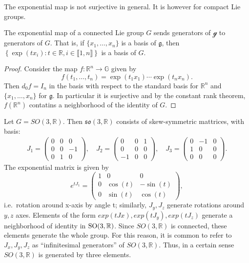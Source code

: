 \documentclass{report}
\begin{document}
\begin{remark}
    The exponential map is not surjective in general. It is however for compact Lie groups.
\end{remark}

\begin{lemma}
    The exponential map of a connected Lie group $G$ sends generators of $\mathcal g$ to generators of $G$.
    That is, if $\{ x_1, \ldots, x_n \}$ is a basis of $\mathfrak g$, then $\left\{ \exp(t x_i) : t \in \mathbb R, i \in \llbracket 1, n \rrbracket \right\}$ is a basis of $G$.
\end{lemma}
\begin{proof}
    Consider the map $f: \mathbb R^n \to \mathbb G$ given by
    \[
    f(t_1, \ldots, t_n) = \exp(t_1 x_1) \cdots \exp(t_n x_n).
    \]
    Then $d_0 f = I_n$ in the basis with respect to the standard basis for $\mathbb R^n$ and $\{ x_1, \ldots, x_n \}$ for $\mathfrak g$.
    In particular it is surjective and by the constant rank theorem, $f(\mathbb R^n)$ contatins a neighborhood of the identity of $G$. 
\end{proof}
\begin{example}
    Let $G = SO(3, \mathbb R)$.
    Then $\mathfrak{so}(3, \mathbb R)$ consists of skew-symmetric mattrices, with basis:
    \begin{align*}
        J_1 = \begin{pmatrix} 0 & 0 & 0 \\ 0 & 0 & -1 \\ 0 & 1 & 0 \end{pmatrix}, \quad
        J_2 = \begin{pmatrix} 0 & 0 & 1 \\ 0 & 0 & 0 \\ -1 & 0 & 0 \end{pmatrix}, \quad
        J_3 = \begin{pmatrix} 0 & -1 & 0 \\ 1 & 0 & 0 \\ 0 & 0 & 0 \end{pmatrix}.
    \end{align*}
    The exponential matrix is given by
    \[
    e^{tJ_1} = 
    \begin{pmatrix}
        1 & 0 & 0 \\
        0 & \cos(t) & -\sin(t) \\
        0 & \sin(t) & \cos(t)
    \end{pmatrix},
    \]
    i.e.\ rotation around x-axis by angle t; similarly, $J_y, J_z$ generate rotations around
    $y, z$ axes.
    Elements of the form $exp(tJx), exp(tJ_y ), exp(tJ_z )$ generate
    a neighborhood of identity in $\operatorname{{\mathrm{SO}}}(3, \mathbb R)$.
    Since $SO(3, \mathbb R)$ is connected, these elements generate the whole group. 
    For this reason, it is common to refer to $J_x , J_y , J_z$ as “inﬁnitesimal generators” of $SO(3, \mathbb R)$. Thus,
    in a certain sense $SO(3, \mathbb R)$ is generated by three elements.
\end{example}
\end{document}
